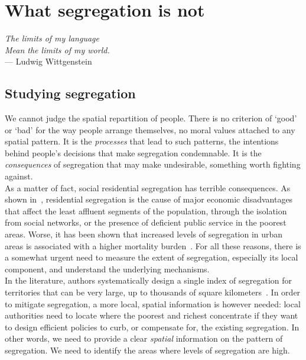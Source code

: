 \chapter{What segregation is not}
\label{chap:segregation_introduction}

\begin{flushright}{\slshape    
The limits of my language\\
Mean the limits of my world.} \\ \medskip
--- Ludwig Wittgenstein~\cite{Wittgenstein:1998}
\end{flushright}


\bigskip


\newcommand{\E}{\mathrm{E}}
\newcommand{\Var}{\mathrm{Var}}

\section{Studying segregation}
\label{sec:studying_segregation}


We cannot judge the spatial repartition of people. There is no criterion of
`good' or `bad' for the way people arrange themselves, no moral values attached
to any spatial pattern. It is the \emph{processes} that lead to such patterns,
the intentions behind people's decisions that make segregation condemnable. It
is the \emph{consequences} of segregation that may make undesirable, something
worth fighting against.\\

As a matter of fact, social residential segregation has terrible consequences.
As shown in~\cite{Massey:1993}, residential segregation is the cause of major
economic disadvantages that affect the least affluent segments of the
population, through the isolation from social networks, or the presence of
deficient public service in the poorest areas. Worse, it has been shown that
increased levels of segregation in urban areas is associated with a higher
mortality burden~\cite{Lobmayer:2002}. For all these reasons, there is a
somewhat urgent need to measure the extent of segregation, especially its local
component, and understand the underlying mechanisms.\\

In the literature, authors systematically design a single index of segregation for
territories that can be very large, up to thousands of square
kilometers~\cite{Apparicio:2000}. In order to mitigate segregation, a more
local, spatial information is however needed: local authorities need to locate
where the poorest and richest concentrate if they want to design efficient
policies to curb, or compensate for, the existing segregation. In other words,
we need to provide a clear {\it spatial} information on the pattern of
segregation. We need to identify the areas where levels of segregation are high.

